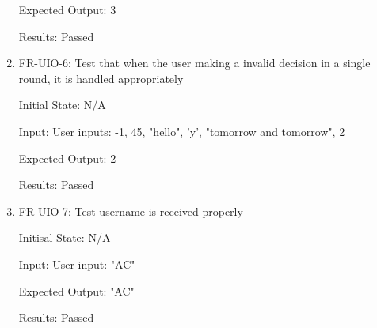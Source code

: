 \documentclass[12pt, titlepage]{article}
\begin{document}
\begin{enumerate}
    Expected Output: 3
    
    Results: Passed

    \item FR-UIO-6: Test that when the user making a invalid decision in a single round, it is handled appropriately
    
    Initial State: N/A
    
    Input: User inputs: -1, 45, "hello", 'y', "tomorrow and tomorrow", 2
    
    Expected Output: 2
    
    Results: Passed
    
    \item FR-UIO-7: Test username is received properly
    
    Initisal State: N/A
    
    Input: User input: "AC"
    
    Expected Output: "AC"
    
    Results: Passed
\end{enumerate}
\end{document}
